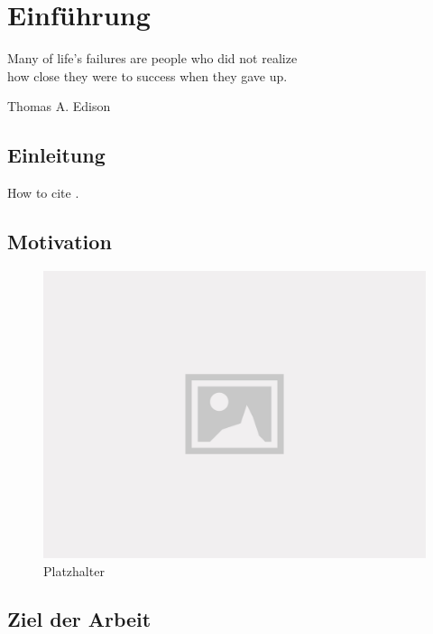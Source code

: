 \chapter{Einführung}
\label{cha:einfuehrung}

\epigraph{Many of life's failures are people who did not realize\\how close they were to success when they gave up.}{Thomas A. Edison}

\section{Einleitung}
\label{sec:einleitung}

How to cite \cite{yt:online}.

\lipsum[9]

\section{Motivation}
\label{sec:motivation}

\begin{figure}[!ht]
    \centering
    \includegraphics[width=0.9\linewidth]{media/placeholder.png}
    \caption[Platzhalter]{Platzhalter}
    \label{fig:srs_process}
\end{figure}

\lipsum[9]

\section{Ziel der Arbeit}
\label{sec:zielderarbeit}

\lipsum[1]

